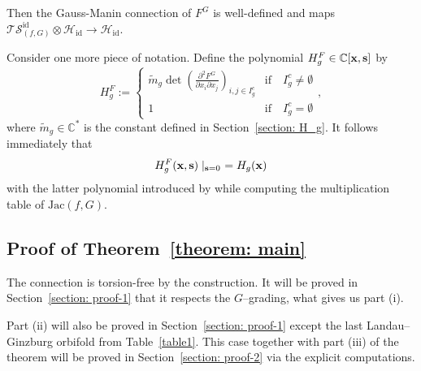 \documentclass[reqno,12pt]{amsart}
\numberwithin{equation}{section}
\theoremstyle{plain}
\theoremstyle{definition}
\newcommand{\CC}{{\mathbb{C}}}
\newcommand{\Jac}{\mathrm{Jac}}
\newcommand{\id}{\mathrm{id}}
\newcommand{\bs}{{\bf s}}
\newcommand{\bx}{{\bf x}}
\def\H{{\mathcal H}}
\def\T{{\mathcal T}}
\numberwithin{equation}{section}
\begin{document}
Then the Gauss-Manin connection of $F^G$ is well-defined and maps ${\T \mathcal{S}^{\id}_{(f,G)} \otimes \H_\id \to \H_\id}$.

Consider one more piece of notation.
Define the polynomial 
$H_{g}^F \in \CC[\bx,\bs]$ by
\begin{equation}
H_{g}^F :=
\begin{cases}
\widetilde{m}_{g}\det \left(\frac{\partial^2 F^G}{\partial x_{i} \partial x_{j}}\right)_{i,j\in I_{g}^c} 
& \text{if} \quad I_{g}^c \neq \emptyset\\
1 & \text{if} \quad I_{g}^c = \emptyset
\end{cases},
\end{equation}
where $\widetilde{m}_{g}\in\CC^\ast$ is the constant defined in Section~\ref{section: H_g}.
It follows immediately that
\[
    H_{g}^F(\bx,\bs) \mid_{\bs = 0} \ = H_g(\bx)
\]
with the latter polynomial introduced by \cite{BTW1} while computing the multiplication table of $\Jac(f,G)$.


\subsection{Proof of Theorem~\ref{theorem: main}}
The connection is torsion-free by the construction. It will be proved in Section~\ref{section: proof-1} that it respects the $G$--grading, what gives us part (i). 

Part (ii) will also be proved in Section~\ref{section: proof-1} except the last Landau--Ginzburg orbifold from Table~\ref{table1}. This case together with part (iii) of the theorem will be proved in Section~\ref{section: proof-2} via the explicit computations.
\end{document}

